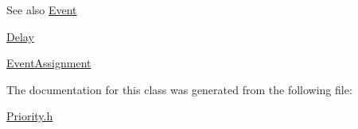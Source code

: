 \begin{DoxySeeAlso}{See also}
\hyperlink{class_event}{Event} 

\hyperlink{class_delay}{Delay} 

\hyperlink{class_event_assignment}{Event\+Assignment} 
\end{DoxySeeAlso}


The documentation for this class was generated from the following file\+:\begin{DoxyCompactItemize}
\item 
\hyperlink{_priority_8h}{Priority.\+h}\end{DoxyCompactItemize}
